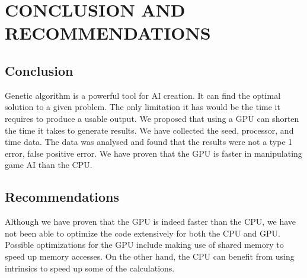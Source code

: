 \chapter{CONCLUSION AND RECOMMENDATIONS}

\section{Conclusion}
Genetic algorithm is a powerful tool for AI creation. It can find the optimal
solution to a given problem. The only limitation it has would be the time it 
requires to produce a usable output. We proposed that using a
GPU can shorten the time it takes to generate results. We have collected the
seed, processor, and time data. The data was analysed and found that the results
were not a type 1 error, false positive error. We have proven that the GPU is faster
in manipulating game AI than the CPU.

\section{Recommendations}
Although we have proven that the GPU is indeed faster than the CPU, we have not
been able to optimize the code extensively for both the CPU and GPU. Possible 
optimizations for the GPU include making use of shared memory to speed up memory
accesses. On the other hand, the CPU can benefit from using intrinsics to speed
up some of the calculations.

  